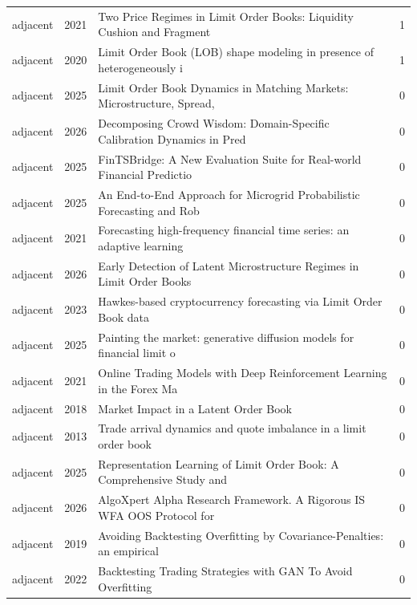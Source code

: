 \begin{longtable}{llp{9.2cm}r}
adjacent & 2021 & Two Price Regimes in Limit Order Books: Liquidity Cushion and Fragment~\citep{krause2021two} & 1 \\
adjacent & 2020 & Limit Order Book (LOB) shape modeling in presence of heterogeneously i~\citep{drame2020limit} & 1 \\
adjacent & 2025 & Limit Order Book Dynamics in Matching Markets: Microstructure, Spread,~\citep{wu2025limit} & 0 \\
adjacent & 2026 & Decomposing Crowd Wisdom: Domain-Specific Calibration Dynamics in Pred~\citep{le2026decomposing} & 0 \\
adjacent & 2025 & FinTSBridge: A New Evaluation Suite for Real-world Financial Predictio~\citep{wang2025fintsbridge} & 0 \\
adjacent & 2025 & An End-to-End Approach for Microgrid Probabilistic Forecasting and Rob~\citep{cao2025end} & 0 \\
adjacent & 2021 & Forecasting high-frequency financial time series: an adaptive learning~\citep{yang2021forecasting} & 0 \\
adjacent & 2026 & Early Detection of Latent Microstructure Regimes in Limit Order Books~\citep{hiremath2026early} & 0 \\
adjacent & 2023 & Hawkes-based cryptocurrency forecasting via Limit Order Book data~\citep{cestari2023hawkes} & 0 \\
adjacent & 2025 & Painting the market: generative diffusion models for financial limit o~\citep{backhouse2025painting} & 0 \\
adjacent & 2021 & Online Trading Models with Deep Reinforcement Learning in the Forex Ma~\citep{ishikawa2021online} & 0 \\
adjacent & 2018 & Market Impact in a Latent Order Book~\citep{lemhadri2018market} & 0 \\
adjacent & 2013 & Trade arrival dynamics and quote imbalance in a limit order book~\citep{lipton2013trade} & 0 \\
adjacent & 2025 & Representation Learning of Limit Order Book: A Comprehensive Study and~\citep{zhong2025representation} & 0 \\
adjacent & 2026 & AlgoXpert Alpha Research Framework. A Rigorous IS WFA OOS Protocol for~\citep{pham2026algoxpert} & 0 \\
adjacent & 2019 & Avoiding Backtesting Overfitting by Covariance-Penalties: an empirical~\citep{koshiyama2019avoiding} & 0 \\
adjacent & 2022 & Backtesting Trading Strategies with GAN To Avoid Overfitting~\citep{sun2022backtesting} & 0 \\

\end{longtable}
